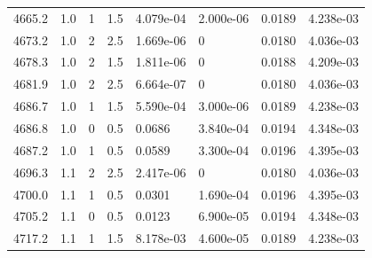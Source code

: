 \documentclass[preview]{standalone}
\begin{document}
{{{{{{{{{{{{{{{{{{\begin{tabular}{L{1.2cm}C{1.2cm} C{0.3cm}C{0.5cm} C{1.4cm}C{1.4cm} C{1.4cm}C{1.4cm}}
  4665.2  &   1.0  & 1     & 1.5 &  4.079e-04  & 2.000e-06  & 0.0189 &  4.238e-03   \\ 
  4673.2  &   1.0  & 2     & 2.5 &  1.669e-06  & 0  & 0.0180 &  4.036e-03   \\ 
  4678.3  &   1.0  & 2     & 1.5 &  1.811e-06  & 0  & 0.0188 &  4.209e-03   \\ 
  4681.9  &   1.0  & 2     & 2.5 &  6.664e-07  & 0  & 0.0180 &  4.036e-03   \\ 
  4686.7  &   1.0  & 1     & 1.5 &  5.590e-04  & 3.000e-06  & 0.0189 &  4.238e-03   \\ 
  4686.8  &   1.0  & 0     & 0.5 &  0.0686  & 3.840e-04  & 0.0194 &  4.348e-03   \\ 
  4687.2  &   1.0  & 1     & 0.5 &  0.0589  & 3.300e-04  & 0.0196 &  4.395e-03   \\ 
  4696.3  &   1.1  & 2     & 2.5 &  2.417e-06  & 0  & 0.0180 &  4.036e-03   \\ 
  4700.0  &   1.1  & 1     & 0.5 &  0.0301  & 1.690e-04  & 0.0196 &  4.395e-03   \\ 
  4705.2  &   1.1  & 0     & 0.5 &  0.0123  & 6.900e-05  & 0.0194 &  4.348e-03   \\ 
  4717.2  &   1.1  & 1     & 1.5 &  8.178e-03  & 4.600e-05  & 0.0189 &  4.238e-03   \\ 
\hline 
\end{tabular} 

}}}}}}}}}}}}}}}}}}
\end{document}
